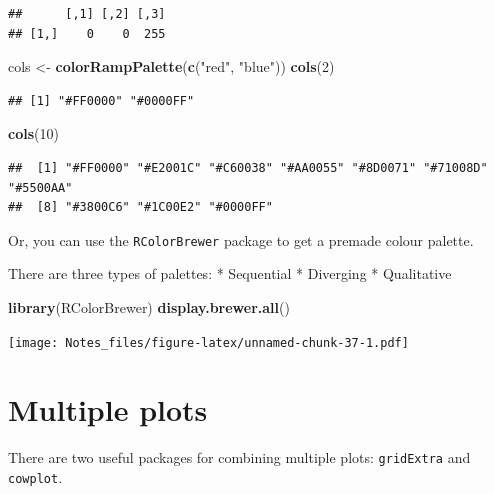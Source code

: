 \documentclass[
]{book}
\newenvironment{Shaded}{\begin{snugshade}}{\end{snugshade}}
\newcommand{\DecValTok}[1]{\textcolor[rgb]{0.00,0.00,0.81}{#1}}
\newcommand{\KeywordTok}[1]{\textcolor[rgb]{0.13,0.29,0.53}{\textbf{#1}}}
\newcommand{\NormalTok}[1]{#1}
\newcommand{\StringTok}[1]{\textcolor[rgb]{0.31,0.60,0.02}{#1}}
\begin{document}
\begin{verbatim}
##      [,1] [,2] [,3]
## [1,]    0    0  255
\end{verbatim}

\begin{Shaded}
\begin{Highlighting}[]
\NormalTok{cols <-}\StringTok{ }\KeywordTok{colorRampPalette}\NormalTok{(}\KeywordTok{c}\NormalTok{(}\StringTok{"red"}\NormalTok{, }\StringTok{"blue"}\NormalTok{))}
\KeywordTok{cols}\NormalTok{(}\DecValTok{2}\NormalTok{)}
\end{Highlighting}
\end{Shaded}

\begin{verbatim}
## [1] "#FF0000" "#0000FF"
\end{verbatim}

\begin{Shaded}
\begin{Highlighting}[]
\KeywordTok{cols}\NormalTok{(}\DecValTok{10}\NormalTok{)}
\end{Highlighting}
\end{Shaded}

\begin{verbatim}
##  [1] "#FF0000" "#E2001C" "#C60038" "#AA0055" "#8D0071" "#71008D" "#5500AA"
##  [8] "#3800C6" "#1C00E2" "#0000FF"
\end{verbatim}

Or, you can use the \texttt{RColorBrewer} package to get a premade colour palette.

There are three types of palettes:
* Sequential
* Diverging
* Qualitative

\begin{Shaded}
\begin{Highlighting}[]
\KeywordTok{library}\NormalTok{(RColorBrewer)}
\KeywordTok{display.brewer.all}\NormalTok{()}
\end{Highlighting}
\end{Shaded}

\texttt{[image: Notes\_files/figure-latex/unnamed-chunk-37-1.pdf]}

\hypertarget{multiple-plots}{%
\section{Multiple plots}\label{multiple-plots}}

There are two useful packages for combining multiple plots: \texttt{gridExtra} and \texttt{cowplot}.
\end{document}
